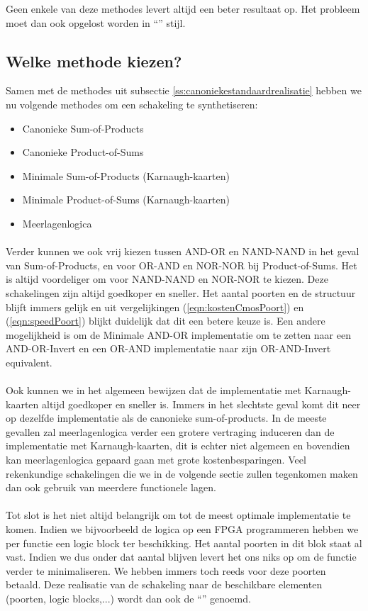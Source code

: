 Geen enkele van deze methodes levert altijd een beter resultaat op. Het probleem moet dan ook opgelost worden in ``'' stijl.
\subsection{Welke methode kiezen?}
Samen met de methodes uit subsectie \ref{ss:canoniekestandaardrealisatie} hebben we nu volgende methodes om een schakeling te synthetiseren:
\begin{itemize}
 \item Canonieke Sum-of-Products
 \item Canonieke Product-of-Sums
 \item Minimale Sum-of-Products (Karnaugh-kaarten)
 \item Minimale Product-of-Sums (Karnaugh-kaarten)
 \item Meerlagenlogica
\end{itemize}
\paragraph{}Verder kunnen we ook vrij kiezen tussen AND-OR en NAND-NAND in het geval van Sum-of-Products, en voor OR-AND en NOR-NOR bij Product-of-Sums. Het is altijd voordeliger om voor NAND-NAND en NOR-NOR te kiezen. Deze schakelingen zijn altijd goedkoper en sneller. Het aantal poorten en de structuur blijft immers gelijk en uit vergelijkingen (\ref{eqn:kostenCmosPoort}) en (\ref{eqn:speedPoort}) blijkt duidelijk dat dit een betere keuze is. Een andere mogelijkheid is om de Minimale AND-OR implementatie om te zetten naar een AND-OR-Invert en een OR-AND implementatie naar zijn OR-AND-Invert equivalent.
\paragraph{}Ook kunnen we in het algemeen bewijzen dat de implementatie met Karnaugh-kaarten altijd goedkoper en sneller is. Immers in het slechtste geval komt dit neer op dezelfde implementatie als de canonieke sum-of-products. In de meeste gevallen zal meerlagenlogica verder een grotere vertraging induceren dan de implementatie met Karnaugh-kaarten, dit is echter niet algemeen en bovendien kan meerlagenlogica gepaard gaan met grote kostenbesparingen. Veel rekenkundige schakelingen die we in de volgende sectie zullen tegenkomen maken dan ook gebruik van meerdere functionele lagen.
\paragraph{}Tot slot is het niet altijd belangrijk om tot de meest optimale implementatie te komen. Indien we bijvoorbeeld de logica op een FPGA programmeren hebben we per functie een logic block ter beschikking. Het aantal poorten in dit blok staat al vast. Indien we dus onder dat aantal blijven levert het ons niks op om de functie verder te minimaliseren. We hebben immers toch reeds voor deze poorten betaald. Deze realisatie van de schakeling naar de beschikbare elementen (poorten, logic blocks,...) wordt dan ook de ``'' genoemd.
